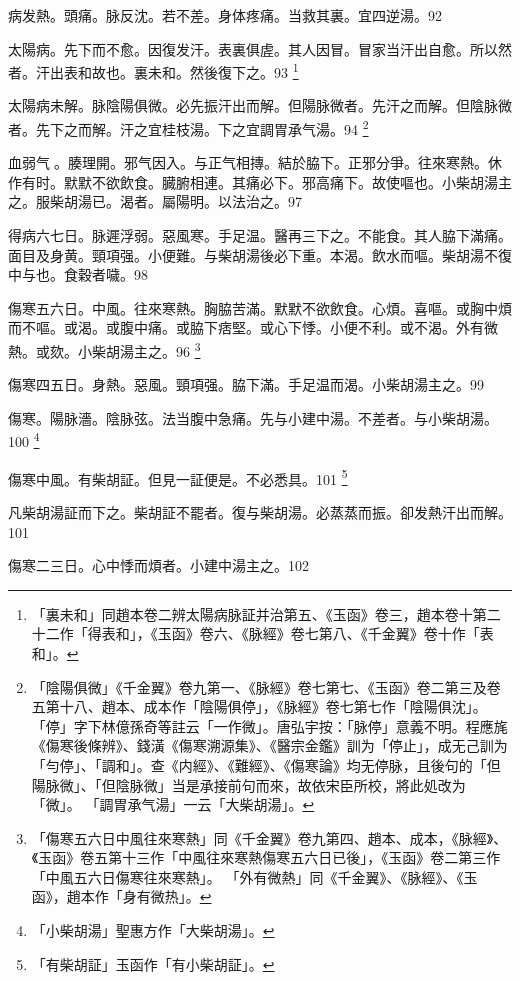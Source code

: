 病发熱。頭痛。脉反沈。若不差。身体疼痛。当救其裏。宜四逆湯。92

太陽病。先下而不愈。因復发汗。表裏俱虗。其人因冒。冒家当汗出自愈。所以然者。汗出表和故也。裏未和。然後{\khaaitp 復}下之。93
	\footnote{
		「裏未和」同趙本卷二辨太陽病脉証并治第五、《玉函》卷三，趙本卷十第二十二作「得表和」，《玉函》卷六、《脉經》卷七第八、《千金翼》卷十作「表和」。
	}

太陽病未解。脉陰陽俱微。必先振汗出而解。但陽{\khaaitp 脉}微者。先汗之而解。但陰{\khaaitp 脉}微者。先下之而解。汗之宜桂枝湯。下之宜{\khaaitp 調胃}承气湯。94
	\footnote{
		「陰陽俱微」《千金翼》卷九第一、《脉經》卷七第七、《玉函》卷二第三及卷五第十八、趙本、成本作「陰陽俱停」，《脉經》卷七第七作「陰陽俱沈」。
		「停」字下林億孫奇等註云「一作微」。唐弘宇按：「脉停」意義不明。程應旄《傷寒後條辨》、錢潢《傷寒溯源集》、《醫宗金鑑》訓为「停止」，成无己訓为「勻停」、「調和」。查《内經》、《難經》、《傷寒論》均无停脉，且後句的「但陽脉微」、「但陰脉微」当是承接前句而來，故依宋臣所校，將此処改为「微」。
		「調胃承气湯」一云「大柴胡湯」。
	}

血弱气{\sungtpii 𥁞}。腠理開。邪气因入。与正气相摶。結於脇下。正邪分爭。往來寒熱。休作有时。默默不欲飲食。臓腑相連。其痛必下。邪高痛下。故使嘔也。小柴胡湯主之。服柴胡湯已。渴者。屬陽明。以法治之。97

得病六七日。脉遲浮弱。惡風寒。手足温。醫再三下之。不能食。其人脇下滿{\khaaitp 痛}。面目及身黄。頸項强。小便難。与柴胡湯後必下重。本渴。飲水而嘔。柴胡{\khaaitp 湯}不復中与也。食穀者噦。98

傷寒五六日。中風。往來寒熱。胸脇苦滿。默默不欲飲食。心煩。喜嘔。或胸中煩而不嘔。或渴。或腹中痛。或脇下痞堅。或心下悸。小便不利。或不渴。外有微熱。或欬。小柴胡湯主之。96
	\footnote{
		「傷寒五六日中風往來寒熱」同《千金翼》卷九第四、趙本、成本，《脉經》、《玉函》卷五第十三作「中風往來寒熱傷寒五六日已後」，《玉函》卷二第三作「中風五六日傷寒往來寒熱」。
		「外有微熱」同《千金翼》、《脉經》、《玉函》，趙本作「身有微热」。
	}

傷寒四五日。身熱。惡風。頸項强。脇下滿。手足温而渴。小柴胡湯主之。99

傷寒。陽脉濇。陰脉弦。法当腹中急痛。先与小建中湯。不差者。与小柴胡湯。100
	\footnote{
	「小柴胡湯」聖惠方作「大柴胡湯」。
	}

傷寒中風。有柴胡証。但見一証便是。不必悉具。101
	\footnote{
	「有柴胡証」玉函作「有小柴胡証」。
	}

凡柴胡湯証而下之。柴胡証不罷者。復与柴胡湯。必蒸蒸而振。卻发熱汗出而解。101

傷寒二三日。心中悸而煩者。小建中湯主之。102

